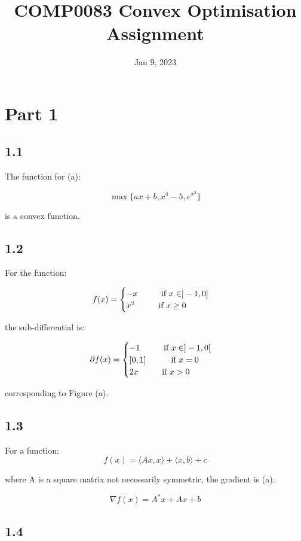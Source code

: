 \documentclass[12pt]{article}
\title{\textbf{COMP0083 Convex Optimisation Assignment}}
\date{Jan 9, 2023}
\newcommand\tab[1][1cm]{\hspace*{#1}}
\begin{document}
\maketitle
\section*{Part 1}
\subsection*{1.1}

The function for (a):

\[\max\{ax+b, x^4-5, e^{x^2}\}\]

is a convex function.

\subsection*{1.2}

For the function:

\[f(x) = \begin{cases}
      -x \tab \text{if } x \in ]-1, 0] \\
      x^2 \tab \text{if } x \geq 0 \\
   \end{cases}\]

the sub-differential is:

\[\partial f(x) = \begin{cases}
      -1 \tab \text{if } x \in ]-1, 0[ \\
      \left[0, 1\right] \tab \text{if } x = 0  \\
      2x \tab \text{if } x > 0 \\
   \end{cases}\]

corresponding to Figure (a).

\subsection*{1.3}
For a function:
\[f(x) = \langle Ax, x \rangle + \langle x, b\rangle + c\]

where A is a square matrix not necessarily symmetric, the gradient is (a):

\[\nabla f(x) = A^*x + Ax + b\]

\subsection*{1.4}
\end{document}
